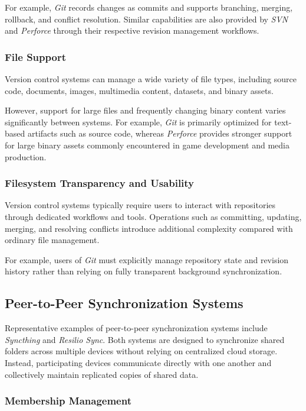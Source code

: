 For example, \textit{Git} records changes as commits and
supports branching, merging, rollback, and conflict
resolution. Similar capabilities are also provided by
\textit{SVN} and \textit{Perforce} through their respective
revision management workflows.

\subsubsection{File Support}

Version control systems can manage a wide variety of file
types, including source code, documents, images, multimedia
content, datasets, and binary assets.

However, support for large files and frequently changing
binary content varies significantly between systems. For
example, \textit{Git} is primarily optimized for text-based
artifacts such as source code, whereas \textit{Perforce}
provides stronger support for large binary assets commonly
encountered in game development and media production.


\subsubsection{Filesystem Transparency and Usability}

Version control systems typically require users to interact
with repositories through dedicated workflows and tools.
Operations such as committing, updating, merging, and
resolving conflicts introduce additional complexity compared
with ordinary file management.

For example, users of \textit{Git} must explicitly manage
repository state and revision history rather than relying on
fully transparent background synchronization.

\subsection{Peer-to-Peer Synchronization Systems}

Representative examples of peer-to-peer synchronization
systems include \textit{Syncthing} and \textit{Resilio Sync}.
Both systems are designed to synchronize shared folders across
multiple devices without relying on centralized cloud storage.
Instead, participating devices communicate directly with one
another and collectively maintain replicated copies of shared
data.

\subsubsection{Membership Management}

